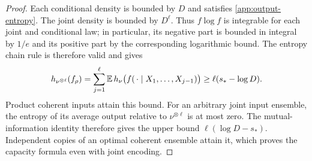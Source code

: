 \begin{proof}
Each conditional density is bounded by $D$ and satisfies
\eqref{app:output-entropy}.  The joint density is bounded by $D^\ell$.
Thus $f\log f$ is integrable for each joint and conditional law;
in particular, its negative part is bounded in integral by $1/e$
and its positive part by the corresponding logarithmic bound.
The entropy chain rule is therefore valid and gives
\begin{equation}
 h_{\nu^{\otimes\ell}}(f_\rho)
 =\sum_{j=1}^\ell
   \mathbb E\,h_\nu\bigl(f(\,\cdot\mid X_1,\ldots,X_{j-1})\bigr)
 \ge\ell(s_*-\log D).
 \label{app:repeated-entropy}
\end{equation}
Product coherent inputs attain this bound.  For an arbitrary joint
input ensemble, the entropy of its average output relative to
$\nu^{\otimes\ell}$ is at most zero.  The mutual-information identity
therefore gives the upper bound $\ell(\log D-s_*)$.
Independent copies of an optimal coherent ensemble attain it,
which proves the capacity formula even with joint encoding.
\end{proof}
